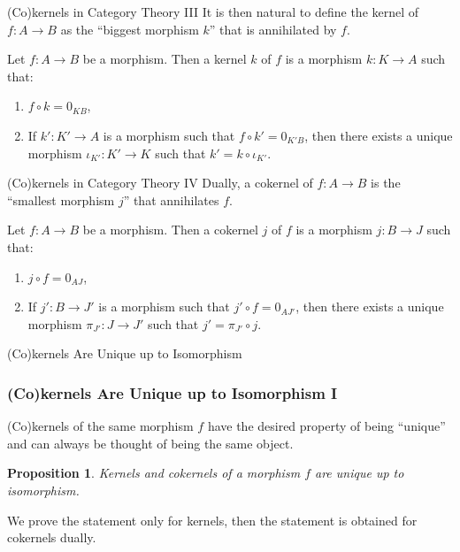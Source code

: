 \documentclass{beamer}
\newtheorem{proposition}{Proposition}
\begin{document}
\begin{frame}{(Co)kernels in Category Theory III}
    It is then natural to define the kernel of $f : A \to B$ as the ``biggest morphism $k$''
    that is annihilated by $f$. \medskip

    \begin{definition}
        Let $f : A \to B$ be a morphism. Then a kernel $k$ of $f$ is a morphism
        $k : K \to A$ such that:
        \begin{enumerate}
            \item $f \circ k = 0_{KB}$,
            \item If $k' : K' \to A$ is a morphism such that $f \circ k' = 0_{K'B}$, then
                there exists a unique morphism $\iota_{K'} : K' \to K$ such that
                $k' = k \circ \iota_{K'}$.
        \end{enumerate}
    \end{definition}
\end{frame}

\begin{frame}{(Co)kernels in Category Theory IV}
    Dually, a cokernel of $f : A \to B$ is the ``smallest morphism $j$'' that
    annihilates $f$. \medskip

    \begin{definition}
        Let $f : A \to B$ be a morphism. Then a cokernel $j$ of $f$ is a morphism
        $j : B \to J$ such that:
        \begin{enumerate}
            \item $j \circ f = 0_{AJ}$,
            \item If $j' : B \to J'$ is a morphism such that $j' \circ f = 0_{AJ'}$, then
                there exists a unique morphism $\pi_{J'} : J \to J'$ such that
                $j' = \pi_{J'} \circ j$.
        \end{enumerate}
    \end{definition}
\end{frame}

\begin{frame}{(Co)kernels Are Unique up to Isomorphism}
    \frametitle{(Co)kernels Are Unique up to Isomorphism I}
    (Co)kernels of the same morphism $f$
    have the desired property of being ``unique'' and can always be thought
    of being the same object. \medskip

    \begin{proposition}
        \label{prop:kernels_unique_up_to_iso}
        Kernels and cokernels of a morphism $f$ are unique up to isomorphism.
    \end{proposition}

    We prove the statement only for kernels, then the statement is obtained for
    cokernels dually. \medskip
\end{frame}
\end{document}
